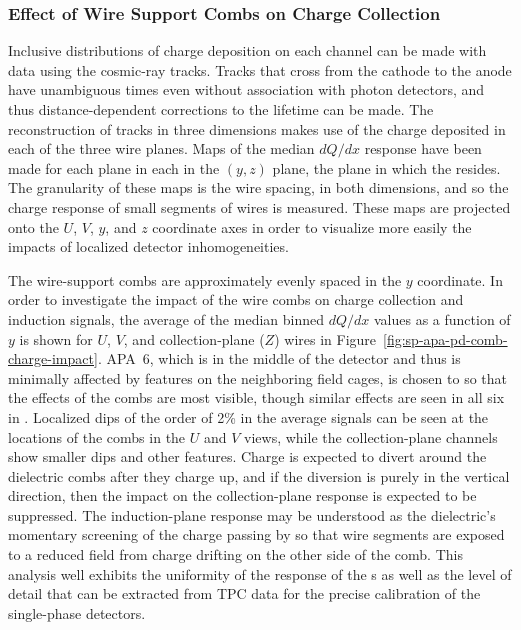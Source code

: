 


\subsubsection{Effect of Wire Support Combs on Charge Collection}
\label{sec:fdsp-apa-qa-protodune-ops-combs-charge}

Inclusive distributions of charge deposition on each channel can be made with  data using the cosmic-ray tracks.  Tracks that cross from the cathode to the anode have unambiguous times even without association with photon detectors, and thus distance-dependent corrections to the lifetime can be made.  The reconstruction of tracks in three dimensions makes use of the charge deposited in each of the three wire planes.  Maps of the median $dQ/dx$ response have been made for each plane in each  in the $(y,z)$ plane, the plane in which the  resides.  The granularity of these maps is the wire spacing, in both dimensions, and so the charge response of small segments of wires is measured.  These maps are projected onto the $U$, $V$, $y$, and $z$ coordinate axes in order to visualize more easily the impacts of localized detector inhomogeneities.

The wire-support combs are approximately evenly spaced in the $y$ coordinate.  In order to investigate the impact of the wire combs on charge collection and induction signals, the average of the median binned $dQ/dx$ values as a function of $y$ is shown for $U$, $V$, and collection-plane ($Z$) wires in Figure~\ref{fig:sp-apa-pd-comb-charge-impact}.  APA~6, which is in the middle of the detector and thus is minimally affected by features on the neighboring field cages, is chosen to so that the effects of the combs are most visible, though similar effects are seen in all six  in .  Localized dips of the order of 2\% in the average signals can be seen at the locations of the combs in the $U$ and $V$ views, while the collection-plane channels show smaller dips and other features.  Charge is expected to divert around the dielectric combs after they charge up, and if the diversion is purely in the vertical direction, then the impact on the collection-plane response is expected to be suppressed.  The induction-plane response may be understood as the dielectric's momentary screening of the charge passing by so that wire segments are exposed to a reduced field from charge drifting on the other side of the comb.  This analysis well exhibits the uniformity of the response of the  s as well as the level of detail that can be extracted from TPC data for the precise calibration of the single-phase detectors.

